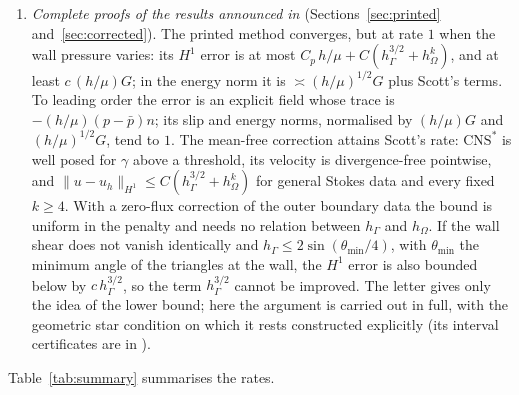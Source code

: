 \documentclass[pdflatex,sn-mathphys-num]{sn-jnl}
\theoremstyle{thmstyleone}
\theoremstyle{thmstylethree}
\newcommand{\hG}{h_\Gamma}
\newcommand{\hO}{h_\Omega}
\newcommand{\pbar}{\bar p}
\newcommand{\norm}[1]{\lVert #1\rVert}
\newcommand{\CNS}{\mathrm{CNS}^\ast}
\begin{document}
\begin{enumerate}[label=(\arabic*)]
\item \emph{Complete proofs of the results announced in \cite{CavalcantePadhiLetter}} (Sections~\ref{sec:printed} and~\ref{sec:corrected}). The printed method converges, but at rate $1$ when the wall pressure varies: its $H^1$ error is at most $C_p\,h/\mu+C(\hG^{3/2}+\hO^k)$, and at least $c\,(h/\mu)G$; in the energy norm it is $\asymp(h/\mu)^{1/2}G$ plus Scott's terms. To leading order the error is an explicit field whose trace is $-(h/\mu)(p-\pbar)n$; its slip and energy norms, normalised by $(h/\mu)G$ and $(h/\mu)^{1/2}G$, tend to $1$. The mean-free correction attains Scott's rate: $\CNS$ is well posed for $\gamma$ above a threshold, its velocity is divergence-free pointwise, and $\norm{u-u_h}_{H^1}\le C(\hG^{3/2}+\hO^k)$ for general Stokes data and every fixed $k\ge4$. With a zero-flux correction of the outer boundary data the bound is uniform in the penalty and needs no relation between $\hG$ and $\hO$. If the wall shear does not vanish identically and $\hG\le2\sin(\theta_{\min}/4)$, with $\theta_{\min}$ the minimum angle of the triangles at the wall, the $H^1$ error is also bounded below by $c\,\hG^{3/2}$, so the term $\hG^{3/2}$ cannot be improved. The letter gives only the idea of the lower bound; here the argument is carried out in full, with the geometric star condition on which it rests constructed explicitly (its interval certificates are in \cite{PadhiExt}).
\end{enumerate}
Table~\ref{tab:summary} summarises the rates.
\end{document}
